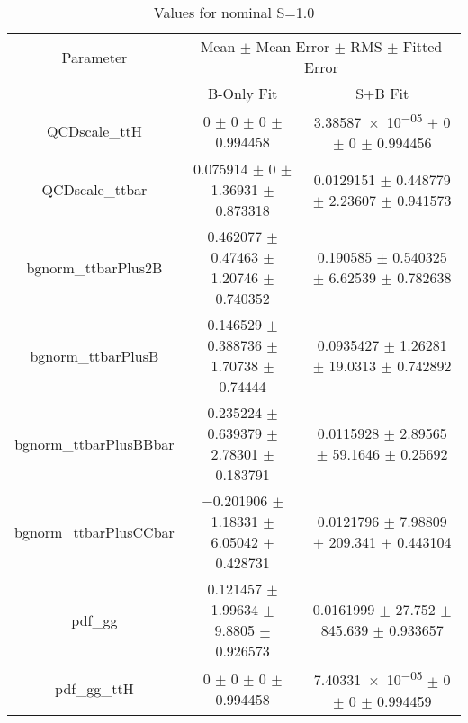 \begin{table}
\centering
\caption{Values for nominal S=1.0}
\begin{tabular}{ccc}
\toprule
Parameter & \multicolumn{2}{c}{Mean $\pm$ Mean Error $\pm$ RMS $\pm$ Fitted Error}\\
 & B-Only Fit & S+B Fit\\
\midrule
QCDscale\_ttH & \num{0} $\pm$ \num{0} $\pm$ \num{0} $\pm$ \num{0.994458} & \num{3.38587e-05} $\pm$ \num{0} $\pm$ \num{0} $\pm$ \num{0.994456}\\
QCDscale\_ttbar & \num{0.075914} $\pm$ \num{0} $\pm$ \num{1.36931} $\pm$ \num{0.873318} & \num{0.0129151} $\pm$ \num{0.448779} $\pm$ \num{2.23607} $\pm$ \num{0.941573}\\
bgnorm\_ttbarPlus2B & \num{0.462077} $\pm$ \num{0.47463} $\pm$ \num{1.20746} $\pm$ \num{0.740352} & \num{0.190585} $\pm$ \num{0.540325} $\pm$ \num{6.62539} $\pm$ \num{0.782638}\\
bgnorm\_ttbarPlusB & \num{0.146529} $\pm$ \num{0.388736} $\pm$ \num{1.70738} $\pm$ \num{0.74444} & \num{0.0935427} $\pm$ \num{1.26281} $\pm$ \num{19.0313} $\pm$ \num{0.742892}\\
bgnorm\_ttbarPlusBBbar & \num{0.235224} $\pm$ \num{0.639379} $\pm$ \num{2.78301} $\pm$ \num{0.183791} & \num{0.0115928} $\pm$ \num{2.89565} $\pm$ \num{59.1646} $\pm$ \num{0.25692}\\
bgnorm\_ttbarPlusCCbar & \num{-0.201906} $\pm$ \num{1.18331} $\pm$ \num{6.05042} $\pm$ \num{0.428731} & \num{0.0121796} $\pm$ \num{7.98809} $\pm$ \num{209.341} $\pm$ \num{0.443104}\\
pdf\_gg & \num{0.121457} $\pm$ \num{1.99634} $\pm$ \num{9.8805} $\pm$ \num{0.926573} & \num{0.0161999} $\pm$ \num{27.752} $\pm$ \num{845.639} $\pm$ \num{0.933657}\\
pdf\_gg\_ttH & \num{0} $\pm$ \num{0} $\pm$ \num{0} $\pm$ \num{0.994458} & \num{7.40331e-05} $\pm$ \num{0} $\pm$ \num{0} $\pm$ \num{0.994459}\\
\bottomrule
\end{tabular}
\end{table}